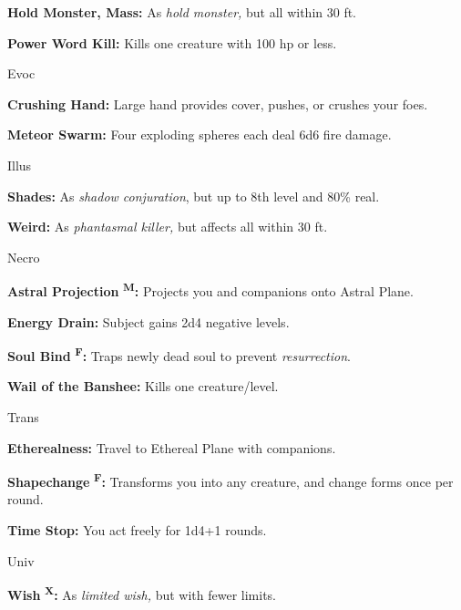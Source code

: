 \documentclass{article}
\begin{document}
\textbf{Hold Monster, Mass:} As \textit{hold monster, }but all within 30 ft.

\textbf{Power Word Kill:} Kills one creature with 100 hp or less.

Evoc

\textbf{Crushing Hand:} Large hand provides cover, pushes, or crushes your foes.

\textbf{Meteor Swarm:} Four exploding spheres each deal 6d6 fire damage.

Illus

\textbf{Shades:} As \textit{shadow conjuration}, but up to 8th level and 80\% real.

\textbf{Weird:} As \textit{phantasmal killer, }but affects all within 30 ft.

Necro

\textbf{Astral Projection }\textsuperscript{\textbf{M}}\textbf{:} Projects you 
and companions onto Astral Plane.

\textbf{Energy Drain:} Subject gains 2d4 negative levels.

\textbf{Soul Bind }\textsuperscript{\textbf{F}}\textbf{:} Traps newly dead soul 
to prevent \textit{resurrection}.

\textbf{Wail of the Banshee:} Kills one creature/level.

Trans

\textbf{Etherealness:} Travel to Ethereal Plane with companions.

\textbf{Shapechange }\textsuperscript{\textbf{F}}\textbf{:} Transforms you into 
any creature, and change forms once per round.

\textbf{Time Stop:} You act freely for 1d4+1 rounds.

Univ

\textbf{Wish }\textsuperscript{\textbf{X}}\textbf{:} As \textit{limited wish, }but 
with fewer limits.

\newpage
\end{document}
